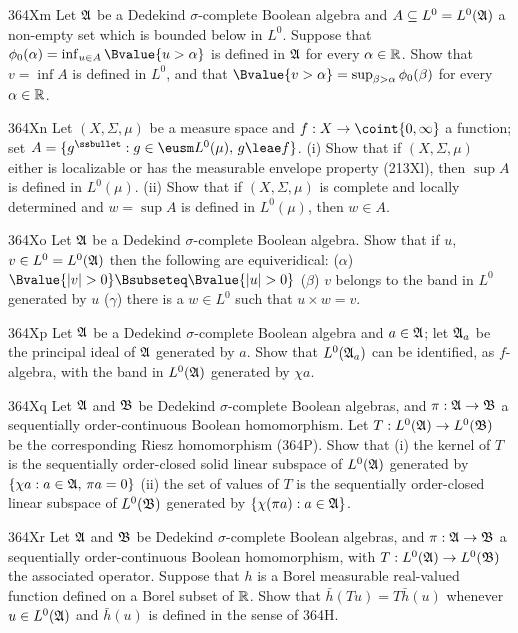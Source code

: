 {\spheader 364Xm
Let $\frak A$ be a Dedekind $\sigma$-complete Boolean algebra and
$A\subseteq L^0=L^0(\frak A)$ a non-empty set which is bounded below in
$L^0$.   Suppose that $\phi_0(\alpha)=\inf_{u\in A}\Bvalue{u>\alpha}$ is
defined in $\frak A$ for every $\alpha\in\Bbb R$.   Show that $v=\inf A$
is defined in $L^0$, and that
$\Bvalue{v>\alpha}=\sup_{\beta>\alpha}\phi_0(\beta)$ for every
$\alpha\in\Bbb R$.

\spheader 364Xn Let $(X,\Sigma,\mu)$ be a measure space and
$f:X\to\coint{0,\infty}$ a function;  set
$A=\{g^{\ssbullet}:g\in\eusm L^0(\mu),\,g\leae f\}$.   (i) Show that if
$(X,\Sigma,\mu)$
either is localizable or has the measurable envelope property
(213Xl), then $\sup A$ is defined in $L^0(\mu)$.   (ii) Show that if
$(X,\Sigma,\mu)$ is complete and locally determined and $w=\sup A$ is
defined in $L^0(\mu)$, then $w\in A$.

\spheader 364Xo Let $\frak A$ be a Dedekind $\sigma$-complete Boolean
algebra.   Show that if $u$, $v\in L^0=L^0(\frak A)$ then the
following are equiveridical:  ($\alpha$)
$\Bvalue{|v|>0}\Bsubseteq\Bvalue{|u|>0}$ ($\beta$) $v$ belongs to the
band in $L^0$ generated by $u$ ($\gamma$) there is a $w\in L^0$ such
that $u\times w=v$.

\sqheader 364Xp Let $\frak A$ be a Dedekind $\sigma$-complete Boolean
algebra and $a\in\frak A$;  let $\frak A_a$ be the principal ideal of
$\frak A$ generated by $a$.   Show that $L^0(\frak A_a)$ can be
identified, as $f$-algebra, with the band in $L^0(\frak A)$ generated
by $\chi a$.

\spheader 364Xq Let $\frak A$ and $\frak B$ be Dedekind
$\sigma$-complete Boolean algebras, and $\pi:\frak A\to\frak B$ a
sequentially order-continuous Boolean homomorphism.   Let
$T:L^0(\frak A)\to L^0(\frak B)$ be the corresponding Riesz homomorphism
(364P).   Show that (i) the kernel of $T$ is the sequentially
order-closed solid linear subspace of $L^0(\frak A)$ generated by
$\{\chi a:a\in\frak A,\,\pi a=0\}$   (ii) the set of values of $T$
is the sequentially
order-closed linear subspace of $L^0(\frak B)$ generated by
$\{\chi(\pi a):a\in\frak A\}$.

\spheader 364Xr Let $\frak A$ and $\frak B$ be Dedekind
$\sigma$-complete Boolean algebras, and $\pi:\frak A\to\frak B$ a
sequentially order-continuous Boolean homomorphism, with
$T:L^0(\frak A)\to L^0(\frak B)$ the associated operator.   Suppose that
$h$ is a Borel measurable real-valued function defined on a Borel subset
of $\Bbb R$.   Show that $\bar h(Tu)=T\bar h(u)$ whenever
$u\in L^0(\frak A)$ and $\bar h(u)$ is defined in the sense of 364H.

}
